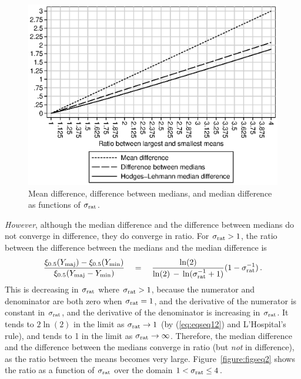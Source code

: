 \documentclass[a4paper]{article}      %
\begin{document}
\begin{figure}[tbp]
\caption{Mean difference, difference between medians, and median difference as functions of $\sigma_{\rm rat}$.}
\label{figure:figseq1}
\includegraphics{figseq1.eps}
\end{figure}

\textit{However}, although the median difference and the difference between medians do not converge in difference,
they do converge in ratio.
For $\sigma_{\rm rat}>1$, the ratio between the difference between the medians and the median difference is
\begin{equation}
{{\xi_{0.5}(Y_{\rm maj}) - \xi_{0.5}(Y_{\rm min})}\over{\xi_{0.5}(Y_{\rm maj}-Y_{\rm min})}}
\quad = \quad
{{\ln(2)}\over{\ln(2) \, - \, \ln(\sigma_{\rm rat}^{-1}+1)}}(1-\sigma_{\rm rat}^{-1}) \, .
\label{eq:eqseq15}
\end{equation}
This is decreasing in $\sigma_{\rm rat}$ where $\sigma_{\rm rat}>1$,
because the numerator and denominator are both zero when $\sigma_{\rm rat}=1$,
and the derivative of the numerator is constant in $\sigma_{\rm rat}$,
and the derivative of the denominator is increasing in $\sigma_{\rm rat}$.
It tends to $2 \ln(2)$ in the limit as $\sigma_{\rm rat}\rightarrow 1$ (by (\ref{eq:eqseq12}) and L'Hospital's rule),
and tends to 1 in the limit as $\sigma_{\rm rat}\rightarrow\infty$.
Therefore, the median difference and the difference between the medians converge in ratio (but \textit{not} in difference),
as the ratio between the means becomes very large.
Figure~\ref{figure:figseq2} shows the ratio as a function of $\sigma_{\rm rat}$ over the domain $1 < \sigma_{\rm rat} \le 4$.
\end{document}
